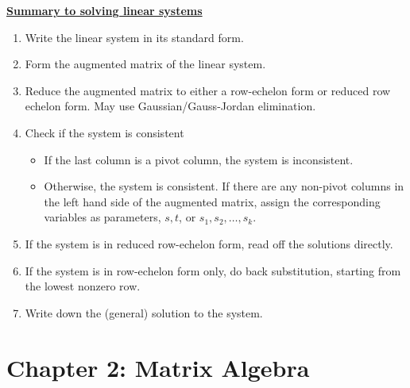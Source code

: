 \documentclass[11pt]{article}
\begin{document}
\underline{\textbf{Summary to solving linear systems}}
\begin{enumerate}
\item Write the linear system in its standard form.
\item Form the augmented matrix of the linear system.
\item Reduce the augmented matrix to either a row-echelon form or reduced row echelon form. May use Gaussian/Gauss-Jordan elimination.
\item Check if the system is consistent
\begin{itemize}
\item If the last column is a pivot column, the system is inconsistent.
\item Otherwise, the system is consistent. If there are any non-pivot columns in the left hand side of the augmented matrix, assign the corresponding variables as parameters, $s, t$, or $s_{1},s_{2},\dots,s_{k}$.
\end{itemize}
\item If the system is in reduced row-echelon form, read off the solutions directly.
\item If the system is in row-echelon form only, do back substitution, starting from the lowest nonzero row.
\item Write down the (general) solution to the system.
\end{enumerate}

\chapter{Chapter 2: Matrix Algebra}

\end{document}
